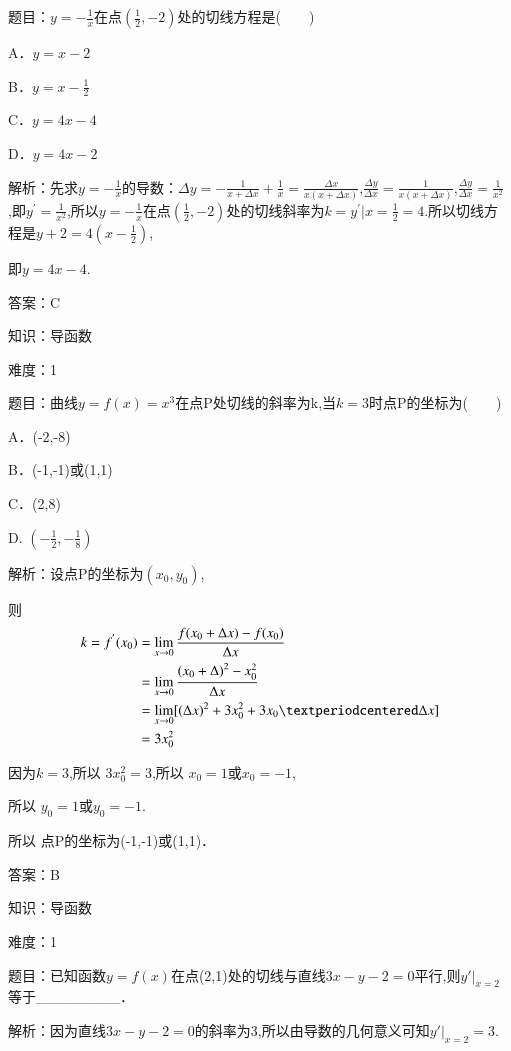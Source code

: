 \documentclass{article} %
\begin{document}
题目：$y=-\frac{1}{x}$在点$(\frac{1}{2},-2)$处的切线方程是(　　)

A．$y=x-2 $

B．$y=x-\frac{1}{2}$

C．$y=4x-4$   

D．$y=4x-2$

解析：先求$y=-\frac{1}{x}$的导数：$\Delta y=-\frac{1}{x+\Delta x}+\frac{1}{x}=\frac{\Delta x}{x(x+\Delta x)}$,$\frac{\Delta y}{\Delta x}=\frac{1}{x(x+\Delta x)}$,$\frac{\Delta y}{\Delta x}=\frac{1}{x^2}$ ,即$y^{'}=\frac{1}{x^2}$,所以$y=-\frac{1}{x}$在点$(\frac{1}{2},-2)$处的切线斜率为$k=y^{'}|x=\frac{1}{2}=4$.所以切线方程是$y+2=4(x-\frac{1}{2})$,

即$y=4x-4$.

答案：C



知识：导函数

难度：1

题目：曲线$y=f(x)=x^{3}$在点P处切线的斜率为k,当$k=3$时点P的坐标为(　　)

A．(-2,-8)   

B．(-1,-1)或(1,1)

C．(2,8)   

D. $(-\frac{1}{2},-\frac{1}{8})$

解析：设点P的坐标为$(x_{0},y_{0})$,

则
\begin{align}
\notag
k=f^{'}(x_{0})
&=\lim\limits_{x \rightarrow 0}\frac{f(x_0+\Delta x)-f(x_0)}{\Delta x}\\\notag
&=\lim\limits_{x \rightarrow 0}\frac{{(x_0+\Delta)}^2-x_0^2}{\Delta x}\\\notag
&=\lim\limits_{x \rightarrow 0}[(\Delta x)^{2}+3x_0^2+3x_{0}·\Delta x]\\\notag
&=3x_0^2
\end{align}

因为$k=3$,所以 $3x_0^2=3$,所以 $x_{0}=1$或$x_{0}=-1$,

所以 $y_{0}=1$或$y_{0}=-1$.

所以 点P的坐标为(-1,-1)或(1,1)．

答案：B



知识：导函数

难度：1

题目：已知函数$y=f(x)$在点(2,1)处的切线与直线$3x-y-2=0$平行,则$y'|_{x=2}$等于\_\_\_\_\_\_\_\_．

解析：因为直线$3x-y-2=0$的斜率为3,所以由导数的几何意义可知$y'|_{x=2}=3$.
\end{document}
